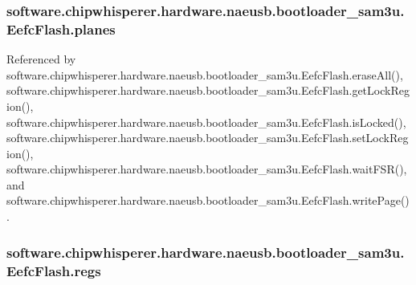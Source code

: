 \hypertarget{classsoftware_1_1chipwhisperer_1_1hardware_1_1naeusb_1_1bootloader__sam3u_1_1EefcFlash_a03df377a46b66c2a7dbb43fecc0d16eb}{}
\subsubsection[{planes}]{\setlength{\rightskip}{0pt plus 5cm}software.\+chipwhisperer.\+hardware.\+naeusb.\+bootloader\+\_\+sam3u.\+Eefc\+Flash.\+planes}\label{classsoftware_1_1chipwhisperer_1_1hardware_1_1naeusb_1_1bootloader__sam3u_1_1EefcFlash_a03df377a46b66c2a7dbb43fecc0d16eb}


Referenced by software.\+chipwhisperer.\+hardware.\+naeusb.\+bootloader\+\_\+sam3u.\+Eefc\+Flash.\+erase\+All(), software.\+chipwhisperer.\+hardware.\+naeusb.\+bootloader\+\_\+sam3u.\+Eefc\+Flash.\+get\+Lock\+Region(), software.\+chipwhisperer.\+hardware.\+naeusb.\+bootloader\+\_\+sam3u.\+Eefc\+Flash.\+is\+Locked(), software.\+chipwhisperer.\+hardware.\+naeusb.\+bootloader\+\_\+sam3u.\+Eefc\+Flash.\+set\+Lock\+Region(), software.\+chipwhisperer.\+hardware.\+naeusb.\+bootloader\+\_\+sam3u.\+Eefc\+Flash.\+wait\+F\+S\+R(), and software.\+chipwhisperer.\+hardware.\+naeusb.\+bootloader\+\_\+sam3u.\+Eefc\+Flash.\+write\+Page().

\hypertarget{classsoftware_1_1chipwhisperer_1_1hardware_1_1naeusb_1_1bootloader__sam3u_1_1EefcFlash_a5c8fd8165fa9e06dbe021f0e1ee1afa3}{}
\subsubsection[{regs}]{\setlength{\rightskip}{0pt plus 5cm}software.\+chipwhisperer.\+hardware.\+naeusb.\+bootloader\+\_\+sam3u.\+Eefc\+Flash.\+regs}\label{classsoftware_1_1chipwhisperer_1_1hardware_1_1naeusb_1_1bootloader__sam3u_1_1EefcFlash_a5c8fd8165fa9e06dbe021f0e1ee1afa3}
\hypertarget{classsoftware_1_1chipwhisperer_1_1hardware_1_1naeusb_1_1bootloader__sam3u_1_1EefcFlash_a48103d66c589c93816c6602f066008ac}{}
